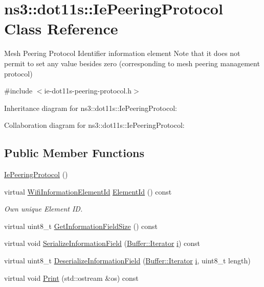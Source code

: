 \hypertarget{classns3_1_1dot11s_1_1IePeeringProtocol}{}\section{ns3\+:\+:dot11s\+:\+:Ie\+Peering\+Protocol Class Reference}
\label{classns3_1_1dot11s_1_1IePeeringProtocol}


Mesh Peering Protocol Identifier information element Note that it does not permit to set any value besides zero (corresponding to mesh peering management protocol)  




{\ttfamily \#include $<$ie-\/dot11s-\/peering-\/protocol.\+h$>$}



Inheritance diagram for ns3\+:\+:dot11s\+:\+:Ie\+Peering\+Protocol\+:


Collaboration diagram for ns3\+:\+:dot11s\+:\+:Ie\+Peering\+Protocol\+:
\subsection*{Public Member Functions}
\begin{DoxyCompactItemize}
\item 
\hyperlink{classns3_1_1dot11s_1_1IePeeringProtocol_a1bf62f3f214edb0b2ec1003d7fadf409}{Ie\+Peering\+Protocol} ()
\item 
virtual \hyperlink{namespacens3_aeb185e0c8a60816016bca079f1420478}{Wifi\+Information\+Element\+Id} \hyperlink{classns3_1_1dot11s_1_1IePeeringProtocol_aa78e0ac5188dc059a6673b861e51b30a}{Element\+Id} () const 
\begin{DoxyCompactList}\small\item\em Own unique Element ID. \end{DoxyCompactList}\item 
virtual uint8\+\_\+t \hyperlink{classns3_1_1dot11s_1_1IePeeringProtocol_a5ebcead24314be129189111d20fc408a}{Get\+Information\+Field\+Size} () const 
\item 
virtual void \hyperlink{classns3_1_1dot11s_1_1IePeeringProtocol_a55bf9bfff96b6a67488c2aa9f0d5b4f9}{Serialize\+Information\+Field} (\hyperlink{classns3_1_1Buffer_1_1Iterator}{Buffer\+::\+Iterator} \hyperlink{lte__uplink__power__control_8m_a6f6ccfcf58b31cb6412107d9d5281426}{i}) const 
\item 
virtual uint8\+\_\+t \hyperlink{classns3_1_1dot11s_1_1IePeeringProtocol_a818bd2c9533e538da6a2cdee0f9c8953}{Deserialize\+Information\+Field} (\hyperlink{classns3_1_1Buffer_1_1Iterator}{Buffer\+::\+Iterator} \hyperlink{lte__uplink__power__control_8m_a6f6ccfcf58b31cb6412107d9d5281426}{i}, uint8\+\_\+t length)
\item 
virtual void \hyperlink{classns3_1_1dot11s_1_1IePeeringProtocol_ad8a9e67eb83d1501e06d9ae89af7563f}{Print} (std\+::ostream \&os) const 
\end{DoxyCompactItemize}
